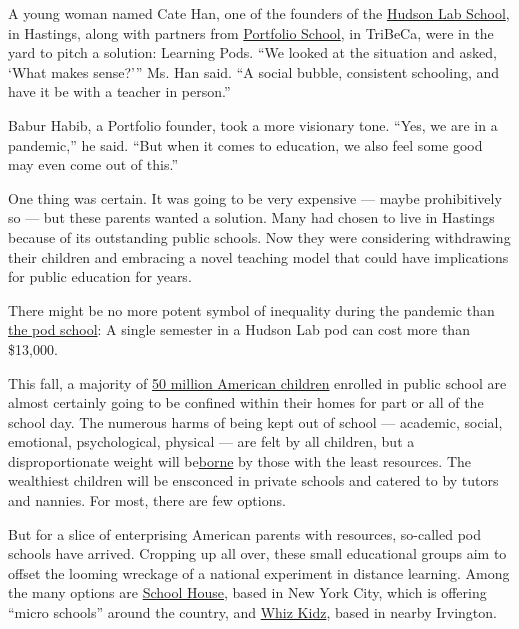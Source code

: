 A young woman named Cate Han, one of the founders of the
\href{https://www.hudsonlabschool.com/}{Hudson Lab School}, in Hastings,
along with partners from
\href{https://www.portfolio-school.com/}{Portfolio School}, in TriBeCa,
were in the yard to pitch a solution: Learning Pods. ``We looked at the
situation and asked, `What makes sense?''' Ms. Han said. ``A social
bubble, consistent schooling, and have it be with a teacher in person.''

Babur Habib, a Portfolio founder, took a more visionary tone. ``Yes, we
are in a pandemic,'' he said. ``But when it comes to education, we also
feel some good may even come out of this.''

One thing was certain. It was going to be very expensive --- maybe
prohibitively so --- but these parents wanted a solution. Many had
chosen to live in Hastings because of its outstanding public schools.
Now they were considering withdrawing their children and embracing a
novel teaching model that could have implications for public education
for years.

There might be no more potent symbol of inequality during the pandemic
than
\href{https://www.nytimes.com/2020/07/22/parenting/school-pods-coronavirus.html}{the
pod school}: A single semester in a Hudson Lab pod can cost more than
\$13,000.

This fall, a majority of
\href{https://nces.ed.gov/programs/digest/d18/tables/dt18_203.10.asp}{50
million American children} enrolled in public school are almost
certainly going to be confined within their homes for part or all of the
school day. The numerous harms of being kept out of school --- academic,
social, emotional, psychological, physical --- are felt by all children,
but a disproportionate weight will
be\href{https://www.nytimes.com/2020/06/05/us/coronavirus-education-lost-learning.html}{borne}
by those with the least resources. The wealthiest children will be
ensconced in private schools and catered to by tutors and nannies. For
most, there are few options.

But for a slice of enterprising American parents with resources,
so-called pod schools have arrived. Cropping up all over, these small
educational groups aim to offset the looming wreckage of a national
experiment in distance learning. Among the many options are
\href{https://www.getschoolhouse.com/}{School House}, based in New York
City, which is offering ``micro schools'' around the country, and
\href{https://www.whizkidztutoring.com/wk-pods}{Whiz Kidz}, based in
nearby Irvington.

